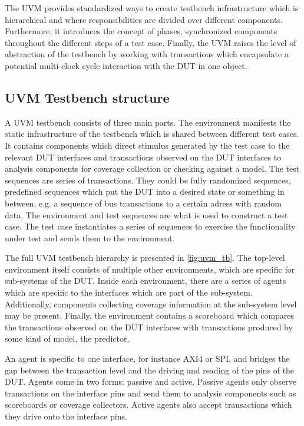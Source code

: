 \documentclass[12pt]{book}
\begin{document}
The UVM provides standardized ways to create testbench infrastructure which is hierarchical and where responsibilities are divided over different components. Furthermore, it introduces the concept of phases, synchronized components throughout the different steps of a test case. Finally, the UVM raises the level of abstraction of the testbench by working with transactions which encapsulate a potential multi-clock cycle interaction with the DUT in one object.

\subsection{UVM Testbench structure}

A UVM testbench consists of three main parts. The environment manifests the static infrastructure of the testbench which is shared between different test cases. It contains components which direct stimulus generated by the test case to the relevant DUT interfaces and transactions observed on the DUT interfaces to analysis components for coverage collection or checking against a model. The test sequences are series of transactions. They could be fully randomized sequences, predefined sequences which put the DUT into a desired state or something in between, e.g. a sequence of bus transactions to a certain adress with random data. The environment and test sequences are what is used to construct a test case. The test case instantiates a series of sequences to exercise the functionality under test and sends them to the environment.

The full UVM testbench hierarchy is presented in \ref{fig:uvm_tb}. The top-level environment itself consists of multiple other environments, which are specific for sub-systems of the DUT. Inside each environment, there are a series of agents which are specific to the interfaces which are part of the sub-system. Additionally, components collecting coverage information at the sub-system level may be present. Finally, the environment contains a scoreboard which compares the transactions observed on the DUT interfaces with transactions produced by some kind of model, the predictor. 

An agent is specific to one interface, for instance AXI4 or SPI, and bridges the gap between the transaction level and the driving and reading of the pins of the DUT. Agents come in two forms: passive and active. Passive agents only observe transactions on the interface pins and send them to analysis components such as scoreboards or coverage collectors. Active agents also accept transactions which they drive onto the interface pins. 
\end{document}
